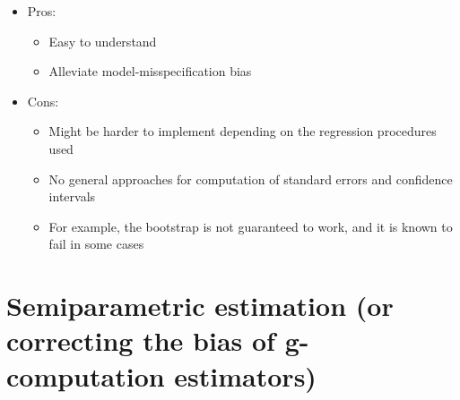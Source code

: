 \documentclass[
  12pt,
]{book}
\providecommand{\tightlist}{%
  \setlength{\itemsep}{0pt}\setlength{\parskip}{0pt}}
\theoremstyle{definition}
\theoremstyle{definition}
\theoremstyle{definition}
\newcommand{\1}{\mathbbm{1}}
\begin{document}
\begin{itemize}
\tightlist
\item
  Pros:

  \begin{itemize}
  \tightlist
  \item
    Easy to understand
  \item
    Alleviate model-misspecification bias
  \end{itemize}
\item
  Cons:

  \begin{itemize}
  \tightlist
  \item
    Might be harder to implement depending on the regression procedures used
  \item
    No general approaches for computation of standard errors and confidence
    intervals
  \item
    For example, the bootstrap is not guaranteed to work, and it is known to
    fail in some cases
  \end{itemize}
\end{itemize}

\hypertarget{semiparametric-estimation-or-correcting-the-bias-of-g-computation-estimators}{%
\section{Semiparametric estimation (or correcting the bias of g-computation estimators)}\label{semiparametric-estimation-or-correcting-the-bias-of-g-computation-estimators}}
\end{document}
